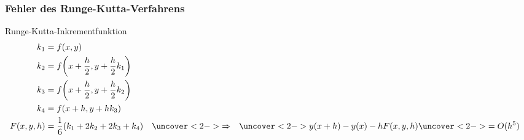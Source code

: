 %
%
%
\begin{frame}
\frametitle{Fehler des Runge-Kutta-Verfahrens}
\begin{block}{Runge-Kutta-Inkrementfunktion}
\vspace{-20pt}
\begin{align*}
k_1 &= f(x,y)
\\
k_2 &= f\biggl(x+\frac{h}2, y+\frac{h}2 k_1\biggr)
\\
k_3 &= f\biggl(x+\frac{h}2, y+\frac{h}2 k_2\biggr)
\\
k_4 &= f(x+h, y+hk_3)
\\
F(x,y,h)
&=
\frac{1}{6} ( k_1 +2k_2 + 2k_3 +k_4)
&&\uncover<2->{\Rightarrow}
&\uncover<2->{y(x+h)-y(x) - hF(x,y,h)}&\uncover<2->{=O(h^5)}
\end{align*}
\vspace{-18pt}
\end{block}
\end{frame}
